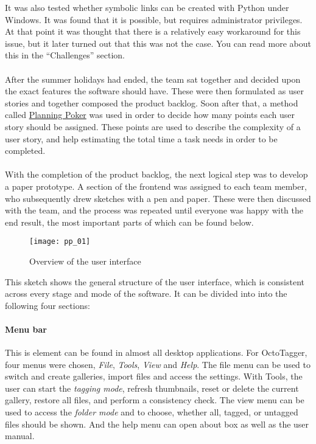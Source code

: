 It was also tested whether symbolic links can be created with Python under
Windows. It was found that it is possible, but requires administrator
privileges. At that point it was thought that there is a relatively easy
workaround for this issue, but it later turned out that this was not the case.
You can read more about this in the ``Challenges'' section. %

\paragraph{}
After the summer holidays had ended, the team sat together and decided upon the
exact features the software should have. These were then formulated as user
stories and together composed the product backlog. Soon after that, a method
called \href{https://en.wikipedia.org/wiki/Planning_poker}{Planning Poker} was
used in order to decide how many points each user story should be assigned.
These points are used to describe the complexity of a user story, and help
estimating the total time a task needs in order to be completed.

\paragraph{}
With the completion of the product backlog, the next logical step was to
develop a paper prototype. A section of the frontend was assigned to each team
member, who subsequently drew sketches with a pen and paper. These were then
discussed with the team, and the process was repeated until everyone was happy
with the end result, the most important parts of which can be found below.

\begin{figure}
	\centering
	\texttt{[image: pp\_01]}
	\caption{Overview of the user interface}
\end{figure}

This sketch shows the general structure of the user interface, which is
consistent across every stage and mode of the software. It can be divided into
into the following four sections:

\paragraph{Menu bar} This is element can be found in almost all desktop
applications. For OctoTagger, four menus were chosen, \textit{File},
\textit{Tools}, \textit{View} and \textit{Help}. The file menu can be used to
switch and create galleries, import files and access the settings. With Tools,
the user can start the \textit{tagging mode}, refresh thumbnails, reset or
delete the current gallery, restore all files, and perform a consistency check.
The view menu can be used to access the \textit{folder mode} and to choose,
whether all, tagged, or untagged files should be shown. And the help menu can
open about box as well as the user manual.


